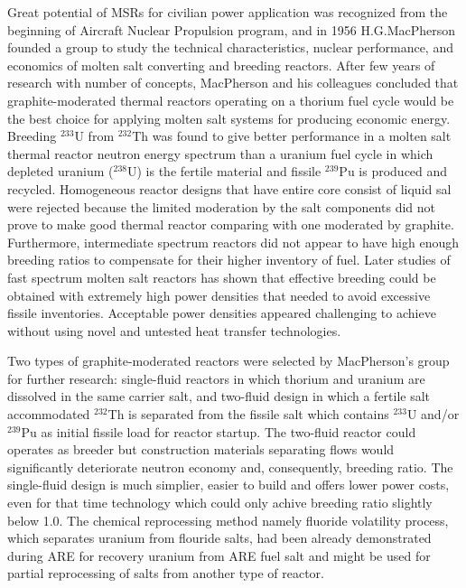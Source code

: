 Great potential of \glspl{MSR} for civilian power application was recognized from the beginning of Aircraft Nuclear Propulsion program, and in 1956 H.G.MacPherson founded a group to study the technical characteristics, nuclear performance, and economics of molten salt converting and breeding reactors. After few years of research with number of concepts, MacPherson and his colleagues concluded that graphite-moderated thermal reactors operating on a thorium fuel cycle would be the best choice for applying molten salt systems for producing economic energy. Breeding $^{233}$U from $^{232}$Th was found to give better performance in a molten salt thermal reactor neutron energy spectrum than a uranium fuel cycle in which depleted uranium ($^{238}$U) is the fertile material and fissile $^{239}$Pu is produced and recycled. Homogeneous reactor designs that have entire core consist of liquid sal were rejected because the limited moderation by the salt components did not prove to make good thermal reactor comparing with one moderated by graphite. Furthermore, intermediate spectrum reactors did not appear to have high enough breeding ratios to compensate for their higher inventory of fuel. Later studies of fast spectrum molten salt reactors \cite{kasten_mosel_1964} has shown that effective breeding could be obtained with extremely high power densities that needed to avoid excessive fissile inventories. Acceptable  power densities appeared challenging to achieve without using novel and untested heat transfer technologies.

Two types of graphite-moderated reactors were selected by MacPherson's group for further research: single-fluid reactors in which thorium and uranium are dissolved in the same carrier salt, and two-fluid design in which a fertile salt accommodated $^{232}$Th is separated from the fissile salt which contains $^{233}$U and/or $^{239}$Pu as initial fissile load for reactor startup. The two-fluid reactor could operates as breeder but construction materials separating flows would significantly deteriorate neutron economy and, consequently, breeding ratio. The single-fluid design is much simplier, easier to build and offers lower power costs, even for that time technology which could only achive breeding ratio slightly below 1.0. The chemical reprocessing method namely fluoride volatility process, which separates uranium from flouride salts, had been already demonstrated during \gls{ARE} for recovery uranium from \gls{ARE} fuel salt and might be used for partial reprocessing of salts from another type of reactor.


